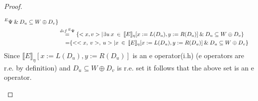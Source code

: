 \documentclass{article}
\begin{document}
\begin{proof}
\begin{enumerate}
\begin{itemize}
\begin{equation*}
\begin{split}
					\prescript{E}{}{\Psi}{}{}\:\&\: 
					D_u \subseteq W \oplus D_v\} \\
					&\stackrel{def \prescript{E}{}{\Psi}{}{}}{=}
					\{<x, v> | \exists u \: 	x\:\in\:
					\llbracket E \rrbracket_\eta
					{[x := L(D_u), y:= R(D_u)]}
					\:\&\: 	D_u \subseteq W \oplus D_v\}	 \\
					&\quad\:{=}
					\{<<x,\:v>,\:u> | x \:\in\:
					\llbracket E \rrbracket_\eta
					{[x := L(D_u), y:= R(D_u)]}
					\:\&\: 	D_u \subseteq W \oplus D_v\}
				\end{split}
				\end{equation*}
				Since $\llbracket E \rrbracket_\eta
				{[x := L(D_u), y:= R(D_u)]}$ is an e operator(i.h)
				(e operators are r.e. by definition) and
				$D_u \subseteq W \oplus D_v$ is r.e. set
				it follows that the above set is an e operator.
				\end{itemize}
		\end{enumerate}
	\end{proof}
	
\end{document}
